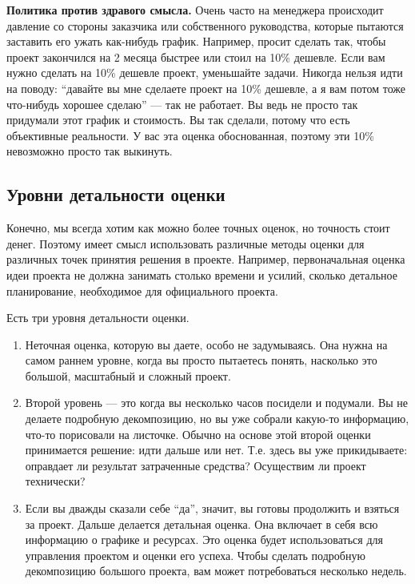 \documentclass{../../text-style}
\begin{document}
\textbf{Политика против здравого смысла.} Очень часто на менеджера происходит давление со стороны заказчика или собственного руководства, которые пытаются заставить его ужать как-нибудь график. Например, просит сделать так, чтобы проект закончился на 2 месяца быстрее или стоил на 10\% дешевле. Если вам нужно сделать на 10\% дешевле проект, уменьшайте задачи. Никогда нельзя идти на поводу: \enquote{давайте вы мне сделаете проект на 10\% дешевле, а я вам потом тоже что-нибудь хорошее сделаю} --- так не работает. Вы ведь не просто так придумали этот график и стоимость. Вы так сделали, потому что есть объективные реальности. У вас эта оценка обоснованная, поэтому эти 10\% невозможно просто так выкинуть.

\subsection{Уровни детальности оценки}

Конечно, мы всегда хотим как можно более точных оценок, но точность стоит денег. Поэтому имеет смысл использовать различные методы оценки для различных точек принятия решения в проекте. Например, первоначальная оценка идеи проекта не должна занимать столько времени и усилий, сколько детальное планирование, необходимое для официального проекта.

Есть три уровня детальности оценки.

\begin{enumerate}
    \item Неточная оценка, которую вы даете, особо не задумываясь. Она нужна на самом раннем уровне, когда вы просто пытаетесь понять, насколько это большой, масштабный и сложный проект.
    \item Второй уровень --- это когда вы несколько часов посидели и подумали. Вы не делаете подробную декомпозицию, но вы уже собрали какую-то информацию, что-то порисовали на листочке. Обычно на основе этой второй оценки принимается решение: идти дальше или нет. Т.е. здесь вы уже прикидываете: оправдает ли результат затраченные средства? Осуществим ли проект технически?
    \item Если вы дважды сказали себе \enquote{да}, значит, вы готовы продолжить и взяться за проект. Дальше делается детальная оценка. Она включает в себя всю информацию о графике и ресурсах. Это оценка будет использоваться для управления проектом и оценки его успеха. Чтобы сделать подробную декомпозицию большого проекта, вам может потребоваться несколько недель.
\end{enumerate}
\end{document}
